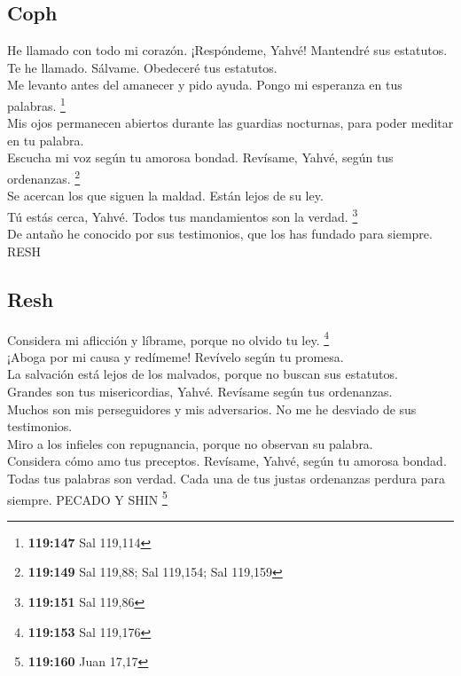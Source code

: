 \hypertarget{coph}{%
\subsection{Coph}\label{coph}}

 He llamado con todo mi corazón. ¡Respóndeme, Yahvé!
Mantendré sus estatutos.\\
 Te he llamado. Sálvame. Obedeceré tus estatutos.\\
 Me levanto antes del amanecer y pido ayuda. Pongo mi
esperanza en tus palabras. \footnote{\textbf{119:147} Sal 119,114}\\
 Mis ojos permanecen abiertos durante las guardias
nocturnas, para poder meditar en tu palabra.\\
 Escucha mi voz según tu amorosa bondad. Revísame,
Yahvé, según tus ordenanzas. \footnote{\textbf{119:149} Sal 119,88; Sal
  119,154; Sal 119,159}\\
 Se acercan los que siguen la maldad. Están lejos de su
ley.\\
 Tú estás cerca, Yahvé. Todos tus mandamientos son la
verdad. \footnote{\textbf{119:151} Sal 119,86}\\
 De antaño he conocido por sus testimonios, que los has
fundado para siempre. RESH

\hypertarget{resh}{%
\subsection{Resh}\label{resh}}

 Considera mi aflicción y líbrame, porque no olvido tu
ley. \footnote{\textbf{119:153} Sal 119,176}\\
 ¡Aboga por mi causa y redímeme! Revívelo según tu
promesa.\\
 La salvación está lejos de los malvados, porque no
buscan sus estatutos.\\
 Grandes son tus misericordias, Yahvé. Revísame según
tus ordenanzas.\\
 Muchos son mis perseguidores y mis adversarios. No me
he desviado de sus testimonios.\\
 Miro a los infieles con repugnancia, porque no observan
su palabra.\\
 Considera cómo amo tus preceptos. Revísame, Yahvé,
según tu amorosa bondad.\\
 Todas tus palabras son verdad. Cada una de tus justas
ordenanzas perdura para siempre. PECADO Y SHIN \footnote{\textbf{119:160}
  Juan 17,17}

